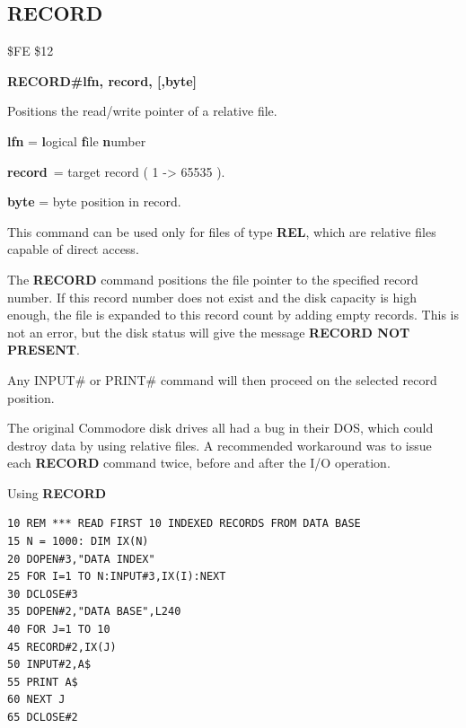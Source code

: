 
\newpage
\subsection{RECORD}
\begin{description}[leftmargin=2cm,style=nextline]
\item [Token:] \$FE \$12
\item [Format:] {\bf RECORD\#lfn, record, [,byte]}
\item [Usage:]  Positions the read/write pointer of a relative file.

                {\bf lfn} = {\bf l}ogical {\bf f}ile {\bf n}umber

                {\bf record} = target record ( 1 -> 65535 ).

                {\bf byte} = byte position in record.

                This command can be used only for files of
                type {\bf REL}, which are relative files capable
                of direct access.

               The {\bf RECORD} command positions the file pointer
               to the specified record number. If this record number
               does not exist and the disk capacity is high enough,
               the file is expanded to this record count by adding
               empty records. This is not an error, but the disk
               status will give the message {\bf RECORD NOT PRESENT}.

               Any INPUT\# or PRINT\# command will then proceed
               on the selected record position.

\item [Remarks:] The original Commodore disk drives all had a bug
               in their DOS, which could destroy data by using
               relative files. A recommended workaround was to
               issue each {\bf RECORD} command twice, before
               and after the I/O operation.

\item [Example:] Using {\bf RECORD}
\begin{tcolorbox}[colback=black,coltext=white]
\verbatimfont{\codefont}
\begin{verbatim}
10 REM *** READ FIRST 10 INDEXED RECORDS FROM DATA BASE
15 N = 1000: DIM IX(N)
20 DOPEN#3,"DATA INDEX"
25 FOR I=1 TO N:INPUT#3,IX(I):NEXT
30 DCLOSE#3
35 DOPEN#2,"DATA BASE",L240
40 FOR J=1 TO 10
45 RECORD#2,IX(J)
50 INPUT#2,A$
55 PRINT A$
60 NEXT J
65 DCLOSE#2
\end{verbatim}
\end{tcolorbox}
\end{description}

